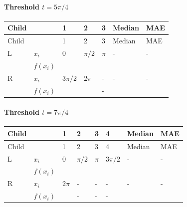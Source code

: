 \documentclass{course_sheet}
\begin{document}
\paragraph*{Threshold $t=5\pi/4$}
\begingroup
\small
\setlength{\tabcolsep}{4pt}
\begin{longtable}{l|l|l|l|l|l|l}
Child &  & 1 & 2 & 3 & Median & MAE \\
\hline
\endfirsthead
Child &  & 1 & 2 & 3 & Median & MAE \\
\hline
\endhead
L & $x_i$ & $0$ & $\pi/2$ & $\pi$ & - & - \\[3pt]
 & $f(x_i)$ & $\phantom{0}$ & $\phantom{0}$ & $\phantom{0}$ & $\phantom{0}$ & $\phantom{0}$ \\[3pt]
R & $x_i$ & $3\pi/2$ & $2\pi$ & - & - & - \\[3pt]
 & $f(x_i)$ & $\phantom{0}$ & $\phantom{0}$ & - & $\phantom{0}$ & $\phantom{0}$ \\[3pt]
\end{longtable}
\endgroup
\paragraph*{Threshold $t=7\pi/4$}
\begingroup
\small
\setlength{\tabcolsep}{4pt}
\begin{longtable}{l|l|l|l|l|l|l|l}
Child &  & 1 & 2 & 3 & 4 & Median & MAE \\
\hline
\endfirsthead
Child &  & 1 & 2 & 3 & 4 & Median & MAE \\
\hline
\endhead
L & $x_i$ & $0$ & $\pi/2$ & $\pi$ & $3\pi/2$ & - & - \\[3pt]
 & $f(x_i)$ & $\phantom{0}$ & $\phantom{0}$ & $\phantom{0}$ & $\phantom{0}$ & $\phantom{0}$ & $\phantom{0}$ \\[3pt]
R & $x_i$ & $2\pi$ & - & - & - & - & - \\[3pt]
 & $f(x_i)$ & $\phantom{0}$ & - & - & - & $\phantom{0}$ & $\phantom{0}$ \\[3pt]
\end{longtable}
\endgroup
\end{document}
